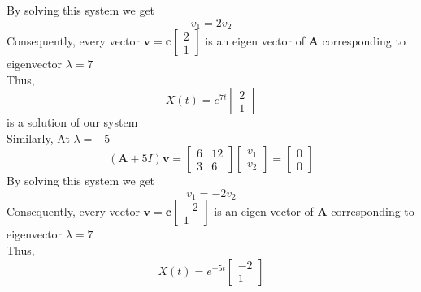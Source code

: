 \documentclass[]{article}
\begin{document}
\begin{example}
\begin{comment}
        \end{bmatrix}
        \begin{bmatrix}
            v_1 \\v_2
        \end{bmatrix}
        =
        \begin{bmatrix}
            v_1 + 12v_2 \\
            3v_1 + v_2
        \end{bmatrix}
        =
        7\begin{bmatrix}
             v_1 \\v_2
         \end{bmatrix}
        =
        \begin{bmatrix}
            7v_1 \\7v_2
        \end{bmatrix}
    \end{align*}
    \end{comment}
    By solving this system we get
    \[
        v_1 = 2v_2
    \]
    Consequently, every vector $\mathbf{v} = \mathbf{c}
        \begin{bmatrix}
            2 \\
            1
        \end{bmatrix}
    $ is an eigen vector of $\mathbf{A}$ corresponding to eigenvector $\lambda = 7$\\
    Thus,
    $$X(t) = e^{7t}
        \begin{bmatrix}
            2 \\
            1
        \end{bmatrix}
    $$
    is a solution of our system\\
    Similarly, At $\lambda = -5$
    $$(\mathbf{A} + 5 I) \mathbf{v} =
        \begin{bmatrix}
            6 & 12 \\
            3 & 6
        \end{bmatrix}
        \begin{bmatrix}
            v_{1} \\
            v_{2}
        \end{bmatrix}=
        \begin{bmatrix}
            0 \\
            0
        \end{bmatrix}
    $$
    By solving this system we get
    \[
        v_1 = -2v_2
    \]
    Consequently, every vector $\mathbf{v} = \mathbf{c}
        \begin{bmatrix}
            -2 \\
            1
        \end{bmatrix}
    $ is an eigen vector of $\mathbf{A}$ corresponding to eigenvector $\lambda = 7$\\
    Thus,
    $$X(t) = e^{-5t}
        \begin{bmatrix}
            -2 \\
            1
        \end{bmatrix}
    $$


\end{example}
\end{document}
